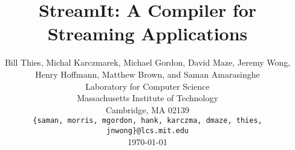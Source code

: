 \documentclass[psfig]{acm_proc_article-sp}
\begin{document}
\title{StreamIt: A Compiler for Streaming Applications}

\author{
\alignauthor \vspace{-18pt} 
Bill Thies, 
Michal Karczmarek, 
Michael Gordon, 
David Maze, 
Jeremy Wong,
Henry Hoffmann, 
Matthew Brown, 
and Saman Amarasinghe\\
	\vspace{12pt}
	Laboratory for Computer Science \\
	Massachusetts Institute of Technology \\
	Cambridge, MA  02139 \\
	\vspace{12pt}
	{\tt \{saman, morris, mgordon, hank, karczma, dmaze, thies, jnwong\}@lcs.mit.edu} \\
	\vspace{12pt}
        \today
}

\newcommand{\ma}[2]{max_{#1 \rightarrow #2}}
\newcommand{\mi}[2]{min_{#1 \leftarrow #2}}
\newcommand{\floor}[2]{\left\lfloor\frac{#1}{#2}\right\rfloor}
\newcommand{\ceil}[2]{\left\lceil\frac{#1}{#2}\right\rceil}
\newtheorem{definition}{Definition}

\maketitle

\begin{abstract}
%
\end{abstract}

%
%


%
%


\end{document}
